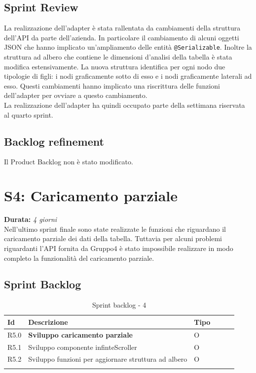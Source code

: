 \subsection{Sprint Review}
La realizzazione dell'adapter è stata rallentata da cambiamenti della struttura dell'API da parte dell'azienda. In particolare il cambiamento di alcuni oggetti JSON che hanno implicato un'ampliamento delle entità \verb|@Serializable|. Inoltre la struttura ad albero che contiene le dimensioni d'analisi della tabella è stata modifica estensivamente. La nuova struttura identifica per ogni nodo due tipologie di figli: i nodi graficamente sotto di esso e i nodi graficamente laterali ad esso. Questi cambiamenti hanno implicato una riscrittura delle funzioni dell'adapter per ovviare a questo cambiamento. \\
La realizzazione dell'adapter ha quindi occupato parte della settimana riservata al quarto sprint.

\subsection{Backlog refinement}
Il Product Backlog non è stato modificato.

\newpage

\section{S4: Caricamento parziale}
\textbf{Durata:} \textit{4 giorni} \\
Nell'ultimo sprint finale sono state realizzate le funzioni che riguardano il caricamento parziale dei dati della tabella. Tuttavia per alcuni problemi riguardanti l'API fornita da Gruppo4 è stato impossibile realizzare in modo completo la funzionalità del caricamento parziale.

\subsection{Sprint Backlog}
\begin{longtable} {
		|>{}p{10mm}| 
		|>{}p{90mm}|
		|>{}p{15mm}|
		|>{}p{15mm}|
		|>{}p{15mm}|
		>{}p{0mm}}
	\hline
	\textbf{Id} & \textbf{Descrizione} & \textbf{Tipo} \\ \hline
	R5.0 & \textbf{Sviluppo caricamento parziale}  & O  \\ \hline
	R5.1   & Sviluppo componente infinteScroller &   O   \\ \hline
	R5.2   & Sviluppo funzioni per aggiornare struttura ad albero & O     \\ \hline
\caption{Sprint backlog - 4}
\end{longtable}

